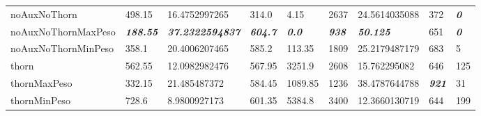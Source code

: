 \begin{table}[H]
\begin{tabular}{lllllllll}
noAuxNoThorn        & 498.15                   & 16.4752997265                   & 314.0                           & 4.15                           & 2637                  & 24.5614035088            & 372                           & \textit{\textbf{0}}                      \\
noAuxNoThornMaxPeso & \textit{\textbf{188.55}} & \textit{\textbf{37.2322594837}} & \textit{\textbf{604.7}}         & \textit{\textbf{0.0}}          & \textit{\textbf{938}} & \textit{\textbf{50.125}} & 651                           & \textit{\textbf{0}}                      \\
noAuxNoThornMinPeso & 358.1                    & 20.4006207465                   & 585.2                           & 113.35                         & 1809                  & 25.2179487179            & 683                           & 5                                        \\
thorn               & 562.55                   & 12.0982982476                   & 567.95                          & 3251.9                         & 2608                  & 15.762295082             & 646                           & 125                                      \\
thornMaxPeso        & 332.15                   & 21.485487372                    & 584.45                          & 1089.85                        & 1236                  & 38.4787644788            & \textit{\textbf{921}}         & 31                                       \\
thornMinPeso        & 728.6                    & 8.9800927173                    & 601.35                          & 5384.8                         & 3400                  & 12.3660130719            & 644                           & 199                                     
\end{tabular}
\end{table}